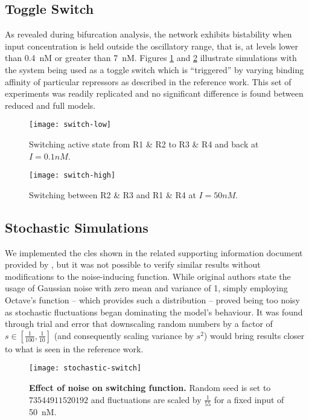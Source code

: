   \subsection{Toggle Switch}

    As revealed during bifurcation analysis, the network exhibits bistability when input concentration is held outside the oscillatory range, that is, at levels lower than \SI{0.4}{\nano M} or greater than \SI{7}{\nano M}.
    Figures \ref{fig:switch-low} and \ref{fig:switch-high} illustrate simulations with the system being used as a toggle switch which is ``triggered'' by varying binding affinity of particular repressors as described in the reference work.
    This set of experiments was readily replicated and no significant difference is found between reduced and full models.

    \begin{figure}[!htb]
      \centering
      \texttt{[image: switch-low]}
      \caption{Switching active state from R1 \& R2 to R3 \& R4 and back at $I = 0.1 nM$.}
      \label{fig:switch-low}
    \end{figure}

    \begin{figure}[!htb]
      \centering
      \texttt{[image: switch-high]}
      \caption{Switching between R2 \& R3 and R1 \& R4 at $I = 50 nM$.}
      \label{fig:switch-high}
    \end{figure}


  \subsection{Stochastic Simulations}

    We implemented the \ac{cles} shown in the related supporting information document provided by \citet{multif}, but it was not possible to verify similar results without modifications to the noise-inducing function.
    While original authors state the usage of Gaussian noise with zero mean and variance of 1, simply employing Octave's  function -- which provides such a distribution \cite{randn} -- proved being too noisy as stochastic fluctuations began dominating the model's behaviour.
    It was found through trial and error that downscaling random numbers by a factor of $s \in [\frac{1}{100}, \frac{1}{10}]$ (and consequently scaling variance by $s^2$) would bring results closer to what is seen in the reference work.

    \begin{figure}[!htb]
      \centering
      \texttt{[image: stochastic-switch]}
      \caption{\textbf{Effect of noise on switching function.} Random seed is set to $73544911520192$ and fluctuations are scaled by $\frac{1}{55}$ for a fixed input of \SI{50}{\nano M}.}
      \label{fig:stochastic-switch}
    \end{figure}


